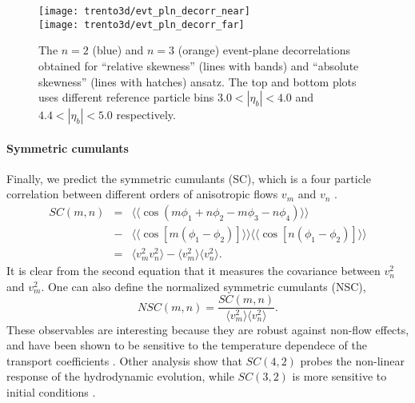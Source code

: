 \begin{figure}
\singlespacing 
\centering
\texttt{[image: trento3d/evt\_pln\_decorr\_near]}\\
\texttt{[image: trento3d/evt\_pln\_decorr\_far]}
\caption[The $n=2$ (blue) and $n=3$ (orange) event-plane decorrelations]{The $n=2$ (blue) and $n=3$ (orange) event-plane decorrelations obtained for ``relative skewness'' (lines with bands) and ``absolute skewness'' (lines with hatches) ansatz. The top and bottom plots uses different reference particle bins $3.0<|\eta_b|<4.0$ and $4.4<|\eta_b|<5.0$ respectively.}
\label{fig:trento:epd}
\end{figure}

\paragraph{Symmetric cumulants} Finally, we predict the symmetric cumulants (SC), which is a four particle correlation between different orders of anisotropic flows $v_m$ and $v_n$ \cite{Niemi:2012aj,Bilandzic:2013kga}.
\begin{eqnarray}
SC(m, n) &=& \langle\langle \cos(m\phi_1+n\phi_2-m\phi_3-n\phi_4)\rangle\rangle \nonumber \\
\nonumber &-& \langle\langle\cos[m(\phi_1-\phi_2)]\rangle\rangle\langle\langle\cos[n(\phi_1-\phi_2)]\rangle\rangle \label{eq:scmn}\\
&=& \langle v_m^2 v_n^2 \rangle - \langle v_m^2\rangle\langle v_n^2\rangle.
\end{eqnarray}
It is clear from the second equation that it measures the covariance between $v_n^2$ and $v_m^2$.
One can also define the normalized symmetric cumulants (NSC),
\begin{equation}
NSC(m,n) = \frac{SC(m,n)}{\langle v_m^2\rangle\langle v_n^2\rangle}.
\end{equation}
These observables are interesting because they are robust against non-flow effects, and have been shown to be sensitive to the temperature dependece of the transport coefficients \cite{ALICE:2016kpq}.
Other analysis show that $SC(4,2)$ probes the non-linear response of the hydrodynamic evolution, while $SC(3,2)$ is more sensitive to initial conditions \cite{Zhu:2016puf}.




